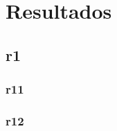 \chapter{Resultados}
\thispagestyle{empty}

\section{r1}

\subsection{r11}


\newpage
\subsection{r12}

